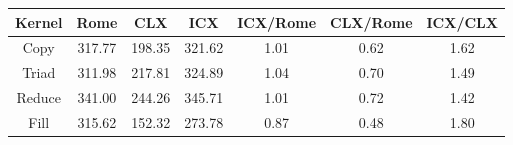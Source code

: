 \begin{tabular}{|c|c|c|c|c|c|c|}  \hline
Kernel&Rome&CLX&ICX & ICX/Rome & CLX/Rome & ICX/CLX \\ \hline 
Copy & 317.77 & 198.35 & 321.62  & 1.01 & 0.62 & 1.62 \\ \hline 
Triad & 311.98 & 217.81 & 324.89  & 1.04 & 0.70 & 1.49 \\ \hline 
Reduce & 341.00 & 244.26 & 345.71  & 1.01 & 0.72 & 1.42 \\ \hline 
Fill & 315.62 & 152.32 & 273.78  & 0.87 & 0.48 & 1.80 \\ \hline 
\end{tabular}
